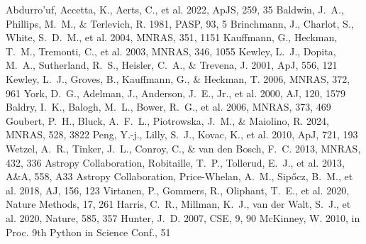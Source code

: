 \documentclass[twocolumn]{aastex631}
\begin{document}
\begin{thebibliography}{}
 Abdurro'uf, Accetta, K., Aerts, C., et al. 2022, ApJS, 259, 35
 Baldwin, J.~A., Phillips, M.~M., \& Terlevich, R. 1981, PASP, 93, 5
 Brinchmann, J., Charlot, S., White, S.~D.~M., et al. 2004, MNRAS, 351, 1151
 Kauffmann, G., Heckman, T.~M., Tremonti, C., et al. 2003, MNRAS, 346, 1055
 Kewley, L.~J., Dopita, M.~A., Sutherland, R.~S., Heisler, C.~A., \& Trevena, J. 2001, ApJ, 556, 121
 Kewley, L.~J., Groves, B., Kauffmann, G., \& Heckman, T. 2006, MNRAS, 372, 961
 York, D.~G., Adelman, J., Anderson, J.~E., Jr., et al. 2000, AJ, 120, 1579
 Baldry, I.~K., Balogh, M.~L., Bower, R.~G., et al. 2006, MNRAS, 373, 469
 Goubert, P.~H., Bluck, A.~F.~L., Piotrowska, J.~M., \& Maiolino, R. 2024, MNRAS, 528, 3822
 Peng, Y.-j., Lilly, S.~J., Kovac, K., et al. 2010, ApJ, 721, 193
 Wetzel, A.~R., Tinker, J.~L., Conroy, C., \& van den Bosch, F.~C. 2013, MNRAS, 432, 336
 Astropy Collaboration, Robitaille, T.~P., Tollerud, E.~J., et al. 2013, A\&A, 558, A33
 Astropy Collaboration, Price-Whelan, A.~M., Sip{\H{o}}cz, B.~M., et al. 2018, AJ, 156, 123
 Virtanen, P., Gommers, R., Oliphant, T.~E., et al. 2020, Nature Methods, 17, 261
 Harris, C.~R., Millman, K.~J., van der Walt, S.~J., et al. 2020, Nature, 585, 357
 Hunter, J.~D. 2007, CSE, 9, 90
 McKinney, W. 2010, in Proc. 9th Python in Science Conf., 51
\end{thebibliography}
\end{document}
